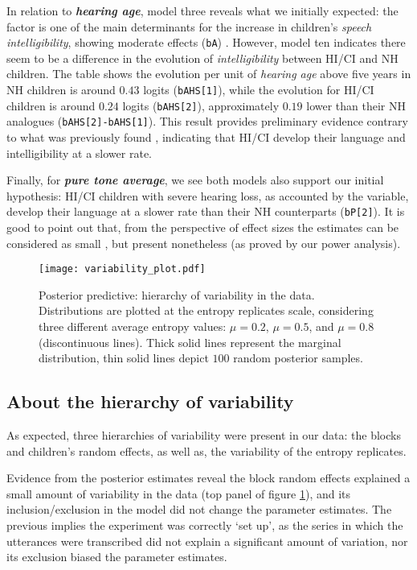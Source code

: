 In relation to \textbf{\textit{hearing age}}, model three reveals what we initially expected: the factor is one of the main determinants for the increase in children's \textit{speech intelligibility}, showing moderate effects (\texttt{bA}) \cite{Cohen_1988, Sawilowsky_2009}. However, model ten indicates there seem to be a difference in the evolution of \textit{intelligibility} between HI/CI and NH children. The table shows the evolution per unit of \textit{hearing age} above five years in NH children is around $0.43$ logits (\texttt{bAHS[1]}), while the evolution for HI/CI children is around $0.24$ logits (\texttt{bAHS[2]}), approximately $0.19$ lower than their NH analogues (\texttt{bAHS[2]-bAHS[1]}). This result provides preliminary evidence contrary to what was previously found \cite{Boonen_et_al_2021}, indicating that HI/CI develop their language and intelligibility at a slower rate.

Finally, for \textbf{\textit{pure tone average}}, we see both models also support our initial hypothesis: HI/CI children with severe hearing loss, as accounted by the variable, develop their language at a slower rate than their NH counterparts (\texttt{bP[2]}). It is good to point out that, from the perspective of effect sizes the estimates can be considered as small \cite{Cohen_1988, Sawilowsky_2009}, but present nonetheless (as proved by our power analysis).
%
%
\begin{figure}[!h]
	\centering
	\texttt{[image: variability\_plot.pdf]}
	\caption[Posterior predictive: hierarchy of variability in the data]{Posterior predictive: hierarchy of variability in the data. Distributions are plotted at the entropy replicates scale, considering three different average entropy values: $\mu=0.2$, $\mu=0.5$, and $\mu=0.8$ (discontinuous lines). Thick solid lines represent the marginal distribution, thin solid lines depict $100$ random posterior samples.}
	\label{fig:variability}
\end{figure}
%
%
\subsection{About the hierarchy of variability} \label{sS:results_variability}
%
As expected, three hierarchies of variability were present in our data: the blocks and children's random effects, as well as, the variability of the entropy replicates.

Evidence from the posterior estimates reveal the block random effects explained a small amount of variability in the data (top panel of figure \ref{fig:variability}), and its inclusion/exclusion in the model did not change the parameter estimates. The previous implies the experiment was correctly `set up', as the series in which the utterances were transcribed did not explain a significant amount of variation, nor its exclusion biased the parameter estimates.

